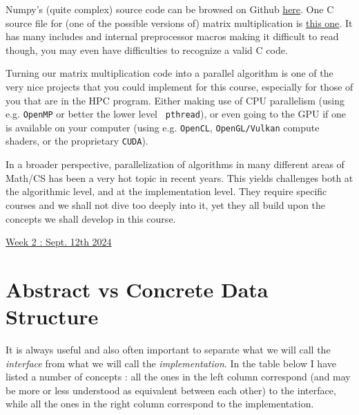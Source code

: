 \documentclass[12pt]{article}
\theoremstyle{plain}
\theoremstyle{remark}
\begin{document}
Numpy's (quite complex) source code can be browsed on Github 
\href{https://github.com/numpy/numpy/tree/main}{here}. One C source
file for (one of the possible versions of) matrix multiplication is
\href{https://github.com/numpy/numpy/blob/main/numpy/_core/src/umath/matmul.c.src}{this
one}. It has many includes and internal preprocessor macros making it difficult 
to read though, you may even have difficulties to recognize a valid C code.   

\medskip

Turning our matrix multiplication code into a parallel algorithm is one of the
very nice projects that you could implement for this course, especially for
those of you that are in the HPC program. Either making use of
CPU parallelism (using e.g. {\tt OpenMP} or better the lower level {\tt
pthread}), or even going to the GPU if one is 
available on your computer (using e.g. {\tt OpenCL}, {\tt OpenGL/Vulkan} 
compute shaders, or the proprietary {\tt CUDA}).

\medskip

In a broader perspective, parallelization of algorithms in many different areas
of Math/CS has been a very hot topic in recent years. This yields challenges both at the
algorithmic level, and at the implementation level. They require specific courses 
and we shall not dive too deeply into it, yet they all build upon the concepts
we shall develop in this course.

\pagebreak

\noindent \underline{{\sc Week 2 : Sept. 12th 2024}}

\section{Abstract vs Concrete Data Structure}

It is always useful and also often important to separate what we will call the 
{\it interface} from what we will call the {\it implementation}. In the table
below I have listed a number of concepts : all the ones in the left column
correspond (and may be more or less understood as equivalent between each
other) to the interface, while all the ones in the right column correspond to
the implementation.

\medskip
\end{document}
